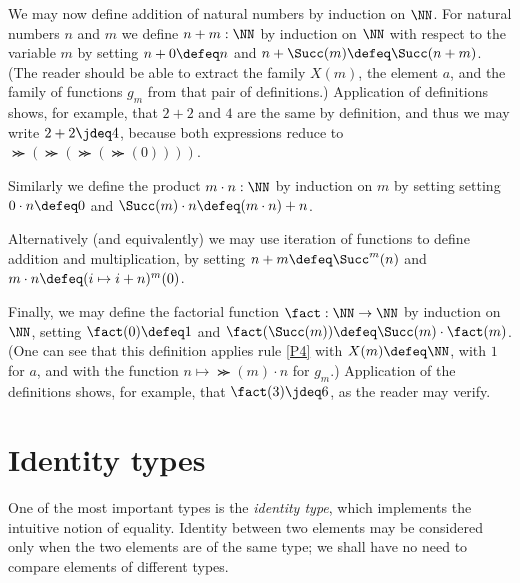 We may now define addition of natural numbers by induction on $\NN$.  For natural numbers $n$ and $m$ we define $n+m : \NN$ by induction on
$\NN$ with respect to the variable $m$ by setting $n+0\defeq n$ and $n+\Succ(m)\defeq \Succ(n+m)$.  (The reader should be able to extract the
family $X(m)$, the element $a$, and the family of functions $g_m$ from that pair of definitions.)  Application of definitions shows, for
example, that $2+2$ and $4$ are the same by definition, and thus we may write $2+2 \jdeq 4$, because both expressions reduce to
$\Succ(\Succ(\Succ(\Succ(0))))$.

Similarly we define the product $m \cdot n : \NN$ by induction on $m$ by setting setting $ 0 \cdot n \defeq 0$ and
$ \Succ(m) \cdot n \defeq (m \cdot n) + n$.

Alternatively (and equivalently) we may use iteration of functions to define addition and multiplication, by setting $n+m \defeq \Succ^m(n)$ and
$m \cdot n \defeq ( i \mapsto i + n )^m (0) $.

Finally, we may define the factorial function $\fact : \NN \to \NN$ by induction on $\NN$, setting $\fact(0) \defeq 1$ and 
$\fact(\Succ(m)) \defeq \Succ(m) \cdot \fact(m)$.  (One can see that this definition applies rule \ref{P4} with $X(m) \defeq \NN$, with $1$ for
$a$, and with the function $n \mapsto \Succ(m) \cdot n$ for $g_m$.)  Application of the definitions shows, for example, that $\fact(3) \jdeq 6$, as
the reader may verify.

\section{Identity types}
\label{sec:identity-types}

One of the most important types is the \emph{identity type}, which implements the intuitive notion of equality.
Identity between two elements may be considered only when
the two elements are of the same type; we shall have no need to compare elements of different types.

